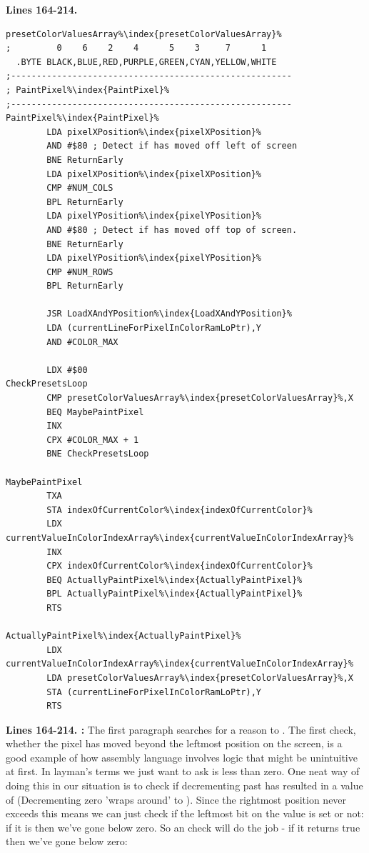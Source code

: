 \clearpage
\textbf{Lines 164-214. }
\begin{lstlisting}[caption=Where the painting is actually done.,escapechar=\%]
presetColorValuesArray%\index{presetColorValuesArray}%
;         0    6    2    4      5    3     7      1
  .BYTE BLACK,BLUE,RED,PURPLE,GREEN,CYAN,YELLOW,WHITE
;-------------------------------------------------------
; PaintPixel%\index{PaintPixel}%
;-------------------------------------------------------
PaintPixel%\index{PaintPixel}%   
        LDA pixelXPosition%\index{pixelXPosition}%
        AND #$80 ; Detect if has moved off left of screen
        BNE ReturnEarly
        LDA pixelXPosition%\index{pixelXPosition}%
        CMP #NUM_COLS
        BPL ReturnEarly
        LDA pixelYPosition%\index{pixelYPosition}%
        AND #$80 ; Detect if has moved off top of screen.
        BNE ReturnEarly
        LDA pixelYPosition%\index{pixelYPosition}%
        CMP #NUM_ROWS
        BPL ReturnEarly

        JSR LoadXAndYPosition%\index{LoadXAndYPosition}%
        LDA (currentLineForPixelInColorRamLoPtr),Y
        AND #COLOR_MAX

        LDX #$00
CheckPresetsLoop   
        CMP presetColorValuesArray%\index{presetColorValuesArray}%,X
        BEQ MaybePaintPixel
        INX 
        CPX #COLOR_MAX + 1
        BNE CheckPresetsLoop

MaybePaintPixel   
        TXA 
        STA indexOfCurrentColor%\index{indexOfCurrentColor}%
        LDX currentValueInColorIndexArray%\index{currentValueInColorIndexArray}%
        INX 
        CPX indexOfCurrentColor%\index{indexOfCurrentColor}%
        BEQ ActuallyPaintPixel%\index{ActuallyPaintPixel}%
        BPL ActuallyPaintPixel%\index{ActuallyPaintPixel}%
        RTS 

ActuallyPaintPixel%\index{ActuallyPaintPixel}%   
        LDX currentValueInColorIndexArray%\index{currentValueInColorIndexArray}%
        LDA presetColorValuesArray%\index{presetColorValuesArray}%,X
        STA (currentLineForPixelInColorRamLoPtr),Y
        RTS 
\end{lstlisting}
\clearpage

\textbf{Lines 164-214. :} The first paragraph searches for a reason to . The first
check, whether the pixel has moved beyond the leftmost position on the screen, is a good example of how assembly language involves
logic that might be unintuitive at first. In layman's terms we just want to ask is  less than zero. One neat
way of doing this in our situation is to check if decrementing past  has resulted in a value of  (Decrementing zero 'wraps
around' to ). Since
the rightmost position never exceeds  this means we can just check if the leftmost bit on the value is set or not: if 
it is then we've gone below zero. So an  check will do the job - if it returns true then we've gone below zero:

